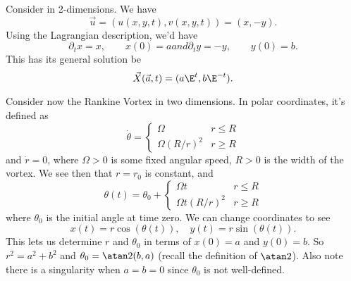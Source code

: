\begin{example}
Consider  in 2-dimensions. We have
\begin{equation*}
\vec{u}=(u(x,y,t), v(x,y,t))=(x,-y).
\end{equation*}
Using the Lagrangian description, we'd have
\begin{subequations}
\begin{equation}
\partial_{t}x = x,\qquad x(0)=a
\end{equation}
and
\begin{equation}
\partial_{t}y=-y,\qquad y(0)=b.
\end{equation}
\end{subequations}
This has its general solution be
\begin{equation}
\vec{X}(\vec{a},t)=(a\E^{t},b\E^{-t}).
\end{equation}
\end{example}

\begin{example}
Consider now the Rankine Vortex in two dimensions. In polar coordinates,
it's defined as  
\begin{equation}
\dot{\theta} = \begin{cases} \Omega & r\leq R\\
\Omega(R/r)^{2} & r\geq R
\end{cases}
\end{equation}
and $\dot{r}=0$, where $\Omega>0$ is some fixed angular speed, $R>0$ is
the width of the vortex. We see then that $r=r_{0}$ is constant, and
\begin{equation}
\theta(t) = \theta_{0} + \begin{cases} \Omega t & r\leq R\\
\Omega t (R/r)^{2} & r\geq R
\end{cases}
\end{equation}
where $\theta_{0}$ is the initial angle at time zero. We can change
coordinates to see
\begin{equation}
x(t) = r\cos(\theta(t)),\quad y(t)=r\sin(\theta(t)).
\end{equation}
This lets us determine $r$ and $\theta_{0}$ in terms of $x(0)=a$ and
$y(0)=b$. So $r^{2}=a^{2}+b^{2}$ and $\theta_{0}=\atan2(b,a)$ (recall
 the definition of $\atan2$). Also
note there is a singularity when $a=b=0$ since $\theta_{0}$ is not
well-defined. 
\end{example}

